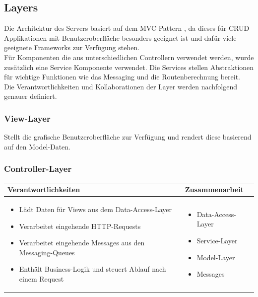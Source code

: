 \subsection{Layers}
Die Architektur des Servers basiert auf dem {MVC Pattern \cite{MVC}}, da dieses für \Gls{CRUD} Applikationen mit Benutzeroberfläche besonders geeignet ist und dafür viele geeignete Frameworks zur Verfügung stehen.\\

Für Komponenten die aus unterschiedlichen Controllern verwendet werden, wurde zusätzlich eine Service Komponente verwendet. Die Services stellen Abstraktionen für wichtige Funktionen wie das Messaging und die Routenberechnung bereit.\\

Die Verantwortlichkeiten und Kollaborationen der Layer werden nachfolgend genauer definiert.

\subsubsection{View-Layer}
Stellt die grafische Benutzeroberfläche zur Verfügung und rendert diese basierend auf den Model-Daten.

\subsubsection{Controller-Layer}
\begin{tabular}{|p{}|p{}|} \hline
	\textbf{Verantwortlichkeiten} & \textbf{Zusammenarbeit} \\ \hline \hline
	\begin{itemize}
		\item Lädt Daten für Views aus dem Data-Access-Layer
		\item Verarbeitet eingehende HTTP-Requests
		\item Verarbeitet eingehende Messages aus den Messaging-Queues
		\item Enthält Business-Logik und steuert Ablauf nach einem Request	
	\end{itemize}&
	\begin{itemize}
		\item Data-Access-Layer
		\item Service-Layer
		\item Model-Layer
		\item Messages
	\end{itemize}
	\\ \hline
\end{tabular}

